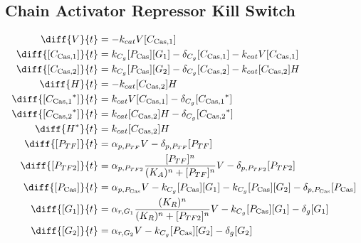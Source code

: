 \subsection{Chain Activator Repressor Kill Switch}
\label{s:Chain_Activator_Repressor_Kill_Switch}

\begin{align}
\diff{\vectorGen{}}{t} & = - \casCutRate{{}}\vectorGen{}\conc{\cplx{\cas}{1}}\\
\diff{\conc{\cplx{\cas}{1}}}{t} & =  \gRnaBind{}\conc{\proSp{\cas{}}}\conc{\gRna{1}} - \casCompDegradeRate{}\conc{\cplx{\cas}{1}} - \casCutRate{{}}\vectorGen{}\conc{\cplx{\cas}{1}}\\
\diff{\conc{\cplx{\cas}{2}}}{t} & =  \gRnaBind{}\conc{\proSp{\cas{}}}\conc{\gRna{2}} - \casCompDegradeRate{}\conc{\cplx{\cas}{2}} - \casCutRate{{}}\conc{\cplx{\cas}{2}}\hostGen{}\\
\diff{\hostGen{}}{t} & = - \casCutRate{{}}\conc{\cplx{\cas}{2}}\hostGen{}\\
\diff{\conc{\bound{\cplx{\cas}{1}}}}{t} & =  \casCutRate{{}}\vectorGen{}\conc{\cplx{\cas}{1}} - \casCompDegradeRate{}\conc{\bound{\cplx{\cas}{1}}}\\
\diff{\conc{\bound{\cplx{\cas}{2}}}}{t} & =  \casCutRate{{}}\conc{\cplx{\cas}{2}}\hostGen{} - \casCompDegradeRate{}\conc{\bound{\cplx{\cas}{2}}}\\
\diff{\edited{\hostGen{}}}{t} & =  \casCutRate{{}}\conc{\cplx{\cas}{2}}\hostGen{}\\
\diff{\conc{\proSp{TF}}}{t} & =  \txtlRate{\proSp{TF}}\vectorGen{} - \proDegradeRate{\proSp{TF}}\conc{\proSp{TF}}\\
\diff{\conc{\proSp{TF2}}}{t} & =  \txtlRate{\proSp{TF2}}\frac{\conc{\proSp{TF}}^n}{(K_A)^n + \conc{\proSp{TF}}^n}\vectorGen{} - \proDegradeRate{\proSp{TF2}}\conc{\proSp{TF2}}\\
\diff{\conc{\proSp{\cas{}}}}{t} & =  \txtlRate{\proSp{\cas{}}}\vectorGen{} - \gRnaBind{}\conc{\proSp{\cas{}}}\conc{\gRna{1}} - \gRnaBind{}\conc{\proSp{\cas{}}}\conc{\gRna{2}} - \proDegradeRate{\proSp{\cas{}}}\conc{\proSp{\cas{}}}\\
\diff{\conc{\gRna{1}}}{t} & =  \txRate{\gRna{1}}\frac{(K_R)^n}{(K_R)^n + \conc{\proSp{TF2}}^n}\vectorGen{} - \gRnaBind{}\conc{\proSp{\cas{}}}\conc{\gRna{1}} - \rnaDegradeRate{}\conc{\gRna{1}}\\
\diff{\conc{\gRna{2}}}{t} & =  \txRate{\gRna{2}}\vectorGen{} - \gRnaBind{}\conc{\proSp{\cas{}}}\conc{\gRna{2}} - \rnaDegradeRate{}\conc{\gRna{2}}
\end{align}

